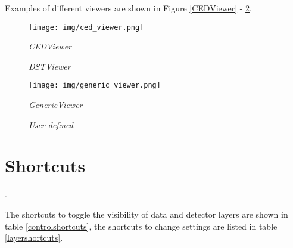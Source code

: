\documentclass[a4paper,10pt]{article}
\begin{document}
Examples of different viewers are shown in Figure \ref{CEDViewer} - \ref{User viewer}. 

\begin{figure}[h]
\begin{minipage}[t]{6cm}
\setlength{\fboxsep}{0mm}
\centerline{\texttt{[image: img/ced\_viewer.png]}}
\caption{\label{CEDViewer} \textsl{CEDViewer}}
\end{minipage}
\hfill
\begin{minipage}[t]{6cm}
\setlength{\fboxsep}{0mm}
\centerline{}
\caption{\label{DSTViewer}\textsl{DSTViewer}}
\end{minipage}
\end{figure}

\begin{figure}[h]
\begin{minipage}[t]{6cm}
\setlength{\fboxsep}{0mm}
\centerline{\texttt{[image: img/generic\_viewer.png]}}
\caption{\label{GenericViewer} \textsl{GenericViewer}}
\end{minipage}
\hfill
\begin{minipage}[t]{6cm}
\setlength{\fboxsep}{0mm}
\centerline{}
\caption{\label{User viewer}\textsl{User defined}}
\end{minipage}
\end{figure}



\section{Shortcuts} 
\label{shortcuts}.


The shortcuts to toggle the visibility of data and detector layers are shown in table \ref{controlshortcuts}, the shortcuts to change settings are listed in table \ref{layershortcuts}.
\end{document}
